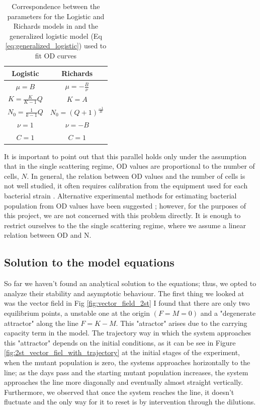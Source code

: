 \documentclass{article}
\begin{document}
\begin{table}
    \centering
    \begin{tabular}{|c|c|}
    \hline
    Logistic     & Richards\\
    \hline
    $\mu = B$     & $\mu = -\frac{B}{\nu}$\\
    $K = \frac{K}{K-1}Q$     & $K = A$\\
    $N_0 = \frac{1}{k-1}Q$     & $N_0 = \left(Q+1\right)^\frac{-1}{B}$\\
    $\nu = 1$     & $\nu = -B$\\
    $C = 1$ & $C = 1$\\
    \hline
    \end{tabular}
    \caption{Correspondence between the parameters for the Logistic and Richards models in \cite{ghenu_challenges_nodate} and the generalized logistic model (Eq \ref{eq:generalized_logistic}) used to fit OD curves}
    \label{tab:parameters_correspondence}
\end{table}

It is important to point out that this parallel holds only under the assumption that in the single scattering regime, OD values are proportional to the number of cells, $N$. In general, the relation between OD values and the number of cells is not well studied, it often requires calibration from the equipment used for each bacterial strain \cite{mira_estimating_2022}. Alternative experimental methods for estimating bacterial population from OD values have been suggested \cite{beal_robust_2020}; however, for the purposes of this project, we are not concerned with this problem directly. It is enough to restrict ourselves to the the single scattering regime, where we assume a linear relation between OD and N.


\subsection{Solution to the model equations}
So far we haven't found an analytical solution to the equations; thus, we opted to analyze their stability and asymptotic behaviour. The first thing we looked at was the vector field in Fig \ref{fig:vector_field_2st} I found that there are only two equilibrium points, a unstable one at the origin $(F = M = 0)$ and a "degenerate attractor" along the line $F = K - M$. This "atractor" arises due to the carrying capacity term in the model. 
The trajectory way in which the system approaches this "attractor" depends on the initial conditions, as it can be see in Figure \ref{fig:2st_vector_fiel_with_trajectory} at the initial stages of the experiment, when the mutant population is zero, the systems approaches horizontally to the line; as the days pass and the starting mutant population increases, the system approaches the line more diagonally and eventually almost straight vertically. Furthermore, we observed that once the system reaches the line, it doesn't fluctuate and the only way for it to reset is by intervention through the dilutions.
\end{document}
